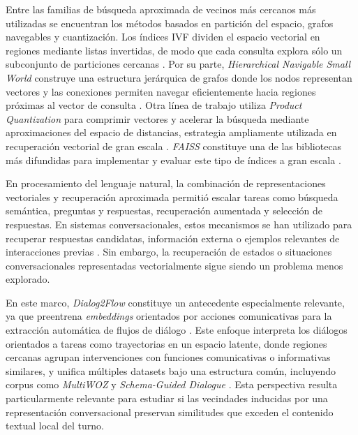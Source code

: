 \documentclass[runningheads]{llncs}
\begin{document}
Entre las familias de búsqueda aproximada de vecinos más cercanos más utilizadas se encuentran los métodos basados en partición del espacio, grafos navegables y cuantización. Los índices IVF dividen el espacio vectorial en regiones mediante listas invertidas, de modo que cada consulta explora sólo un subconjunto de particiones cercanas \cite{sivic2003video,johnson2021billion}. Por su parte, \textit{Hierarchical Navigable Small World} construye una estructura jerárquica de grafos donde los nodos representan vectores y las conexiones permiten navegar eficientemente hacia regiones próximas al vector de consulta \cite{malkov2020hnsw}. Otra línea de trabajo utiliza \textit{Product Quantization} para comprimir vectores y acelerar la búsqueda mediante aproximaciones del espacio de distancias, estrategia ampliamente utilizada en recuperación vectorial de gran escala \cite{jegou2011pq,johnson2021billion}. \textit{FAISS} constituye una de las bibliotecas más difundidas para implementar y evaluar este tipo de índices a gran escala \cite{johnson2021billion}.

En procesamiento del lenguaje natural, la combinación de representaciones vectoriales y recuperación aproximada permitió escalar tareas como búsqueda semántica, preguntas y respuestas, recuperación aumentada y selección de respuestas. En sistemas conversacionales, estos mecanismos se han utilizado para recuperar respuestas candidatas, información externa o ejemplos relevantes de interacciones previas \cite{eric2017key,sahoo2022retrieval,raposo2023prompting}. Sin embargo, la recuperación de estados o situaciones conversacionales representadas vectorialmente sigue siendo un problema menos explorado.

En este marco, \textit{Dialog2Flow} constituye un antecedente especialmente relevante, ya que preentrena \textit{embeddings} orientados por acciones comunicativas para la extracción automática de flujos de diálogo \cite{burdisso2024dialog2flow}. Este enfoque interpreta los diálogos orientados a tareas como trayectorias en un espacio latente, donde regiones cercanas agrupan intervenciones con funciones comunicativas o informativas similares, y unifica múltiples datasets bajo una estructura común, incluyendo corpus como \textit{MultiWOZ} \cite{budzianowski2018multiwoz,zang2020multiwoz22} y \textit{Schema-Guided Dialogue} \cite{rastogi2020schema}. Esta perspectiva resulta particularmente relevante para estudiar si las vecindades inducidas por una representación conversacional preservan similitudes que exceden el contenido textual local del turno.
\end{document}
